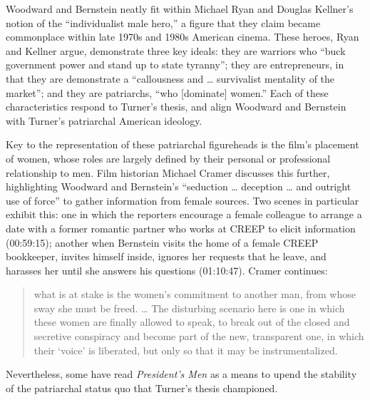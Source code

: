 Woodward and Bernstein neatly fit within Michael Ryan and Douglas Kellner’s notion of the ``individualist male hero,” a figure that they claim became commonplace within late 1970s and 1980s American cinema.\autocites[][15]{ryan_camera_1988}
These heroes, Ryan and Kellner argue, demonstrate three key ideals:
they are warriors who ``buck government power and stand up to state tyranny”;
they are entrepreneurs, in that they are demonstrate a ``callousness and … survivalist mentality of the market”;
and they are patriarchs, ``who [dominate] women.”\autocites[][219-220]{ryan_camera_1988}
Each of these characteristics respond to Turner's thesis, and align Woodward and Bernstein with Turner's patriarchal American ideology.

Key to the representation of these patriarchal figureheads is the film's placement of women, whose roles are largely defined by their personal or professional relationship to men.
Film historian Michael Cramer discusses this further, highlighting Woodward and Bernstein’s ``seduction … deception … and outright use of force” to gather information from female sources.\autocites[][196]{cramer_neoliberal_2022}
Two scenes in particular exhibit this:
one in which the reporters encourage a female colleague to arrange a date with a former romantic partner who works at CREEP to elicit information (00:59:15);
another when Bernstein visits the home of a female CREEP bookkeeper, invites himself inside, ignores her requests that he leave, and harasses her until she answers his questions (01:10:47).
Cramer continues: 
\begin{quote}
    what is at stake is the women’s commitment to another man, from whose sway she must be freed. … The disturbing scenario here is one in which these women are finally allowed to speak, to break out of the closed and secretive conspiracy and become part of the new, transparent one, in which their `voice’ is liberated, but only so that it may be instrumentalized.\autocites[][196]{cramer_neoliberal_2022}
\end{quote}
Nevertheless, some have read \textit{President's Men} as a means to upend the stability of the patriarchal status quo that Turner's thesis championed.

